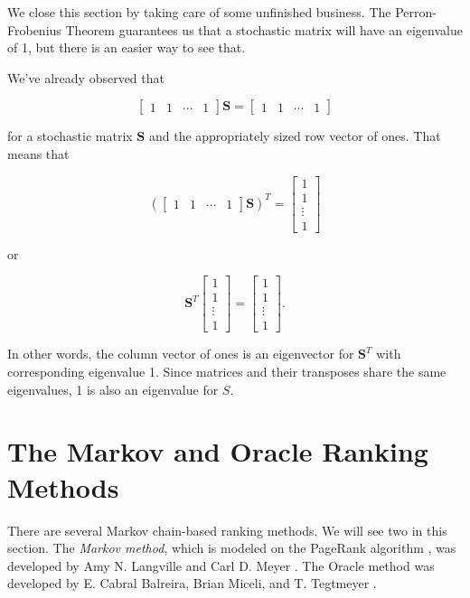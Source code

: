 \documentclass[
]{book}
\theoremstyle{definition}
\theoremstyle{definition}
\theoremstyle{definition}
\theoremstyle{definition}
\theoremstyle{remark}
\begin{document}
We close this section by taking care of some unfinished business. The Perron-Frobenius Theorem guarantees us that a stochastic matrix will have an eigenvalue of 1, but there is an easier way to see that.

We've already observed that

\[\begin{bmatrix} 1 & 1 & \cdots & 1\end{bmatrix}\mathbf{S}=\begin{bmatrix} 1 & 1 & \cdots & 1\end{bmatrix}\]

for a stochastic matrix \(\mathbf{S}\) and the appropriately sized row vector of ones. That means that

\[(\begin{bmatrix} 1 & 1 & \cdots & 1\end{bmatrix}\mathbf{S})^T=\begin{bmatrix}1\\1\\ \vdots \\ 1\end{bmatrix}\]

or

\[\mathbf{S}^T\begin{bmatrix}1\\1\\ \vdots \\ 1\end{bmatrix}=\begin{bmatrix}1\\1\\ \vdots \\ 1\end{bmatrix}.\]

In other words, the column vector of ones is an eigenvector for \(\mathbf{S}^T\) with corresponding eigenvalue 1. Since matrices and their transposes share the same eigenvalues, 1 is also an eigenvalue for \(S\).

\section{The Markov and Oracle Ranking Methods}\label{the-markov-and-oracle-ranking-methods}

There are several Markov chain-based ranking methods. We will see two in this section. The \emph{Markov method}, which is modeled on the PageRank algorithm \autocite{PageRank}, was developed by Amy N. Langville and Carl D. Meyer \autocite{No1}. The Oracle method was developed by E. Cabral Balreira, Brian Miceli, and T. Tegtmeyer \autocite{Oracle}.
\end{document}
